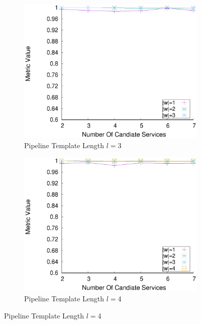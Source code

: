     \begin{figure}[ht!]
      \centering
      \begin{subfigure}{0.49\textwidth}
        \includegraphics[width=\textwidth]{Images/graphs/window_quality_performance_diff_qual_n7_s7_50_80_n3}
        \caption{Pipeline Template Length $l$$=$3}
        \label{fig:quality_window_average_qualitative_n3}
      \end{subfigure}
      \hfill
      \begin{subfigure}{0.49\textwidth}
        \includegraphics[width=\textwidth]{Images/graphs/window_quality_performance_diff_qual_n7_s7_50_80_n4}
        \caption{Pipeline Template Length $l$$=$4}

\end{subfigure}
\end{figure}
